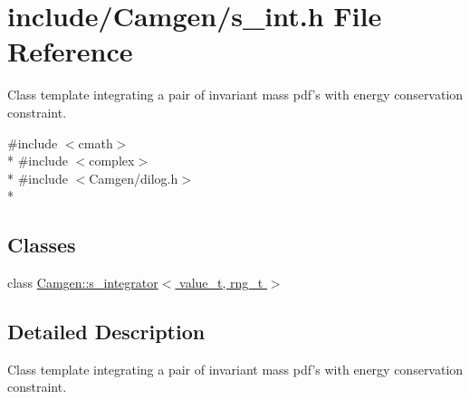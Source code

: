 \hypertarget{a00736}{\section{include/\-Camgen/s\-\_\-int.h File Reference}
\label{a00736}
}


Class template integrating a pair of invariant mass pdf's with energy conservation constraint.  


{\ttfamily \#include $<$cmath$>$}\\*
{\ttfamily \#include $<$complex$>$}\\*
{\ttfamily \#include $<$Camgen/dilog.\-h$>$}\\*
\subsection*{Classes}
\begin{DoxyCompactItemize}
\item 
class \hyperlink{a00483}{Camgen\-::s\-\_\-integrator$<$ value\-\_\-t, rng\-\_\-t $>$}
\end{DoxyCompactItemize}


\subsection{Detailed Description}
Class template integrating a pair of invariant mass pdf's with energy conservation constraint. 